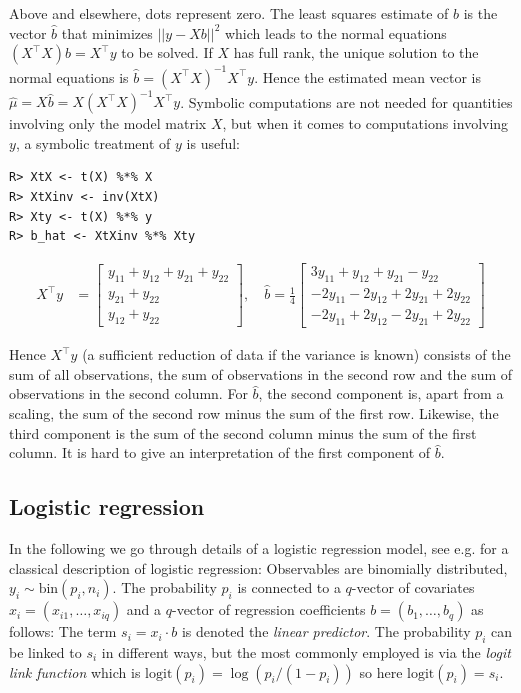 Above and elsewhere, dots represent zero.
The least squares estimate of \(b\) is the vector \(\hat{b}\) that minimizes \(||y-X b||^2\) which leads to the normal equations \((X^\top X)b = X^\top y\) to be solved. If \(X\) has full rank, the unique solution to the normal
equations is \(\hat{b} = (X^\top X)^{-1} X^\top y\). Hence the
estimated mean vector is \(\hat \mu = X\hat{b}=X(X^\top X)^{-1} X^\top y\). Symbolic computations are
not needed for quantities involving only the model matrix \(X\), but
when it comes to computations involving \(y\), a symbolic treatment of
\(y\) is useful:

\begin{verbatim}
R> XtX <- t(X) %*% X
R> XtXinv <- inv(XtX)
R> Xty <- t(X) %*% y
R> b_hat <- XtXinv %*% Xty
\end{verbatim}

\begin{align}
X^\top y &= \left[\begin{matrix}y_{11} + y_{12} + y_{21} + y_{22}\\y_{21} + y_{22}\\y_{12} + y_{22}\end{matrix}\right] , 
\quad
\hat{b} = \frac{1}{4}  \left[\begin{matrix}3 y_{11} + y_{12} + y_{21} - y_{22}\\- 2 y_{11} - 2 y_{12} + 2 y_{21} + 2 y_{22}\\- 2 y_{11} + 2 y_{12} - 2 y_{21} + 2 y_{22}\end{matrix}\right]
\end{align}

Hence \(X^\top y\) (a sufficient reduction of data if the variance is known)
consists of the sum of all observations, the sum of
observations in the second row and the sum of observations in the second column. For \(\hat{b}\), the second component is, apart from a scaling, the sum of the second row minus the sum of the first row. Likewise, the third component is the sum of the second column minus the sum of the first column. It is hard to give an interpretation of the first component of \(\hat{b}\).

\hypertarget{logistic-regression}{%
\subsection{Logistic regression}\label{logistic-regression}}

In the following we go through details of a logistic regression model,
see e.g. \cite{mccullagh} for a classical description of logistic
regression: Observables are binomially distributed, \(y_i \sim \text{bin}(p_i, n_i)\). The probability \(p_i\) is connected to a
\(q\)-vector of covariates \(x_i=(x_{i1}, \dots, x_{iq})\) and a
\(q\)-vector of regression coefficients \(b=(b_1, \dots, b_q)\) as
follows: The term \(s_i = x_i \cdot b\) is denoted the \emph{linear
predictor}. The probability \(p_i\) can be linked to \(s_i\) in different
ways, but the most commonly employed is via the \emph{logit link
function} which is \(\text{logit}(p_i) = \log(p_i/(1-p_i))\) so here
\(\text{logit}(p_i) = s_i\).

